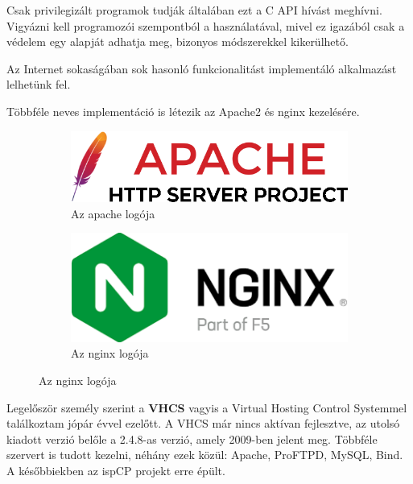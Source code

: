 Csak privilegizált programok tudják általában ezt a C API hívást meghívni. Vigyázni kell programozói szempontból a használatával, mivel ez igazából csak a védelem egy alapját adhatja meg, bizonyos módszerekkel kikerülhető.

Az Internet sokaságában sok hasonló funkcionalitást implementáló alkalmazást lelhetünk fel.

Többféle neves implementáció is létezik az Apache2 és nginx kezelésére. 

\begin{figure}[h]
	\caption{A webszerverek logói}
	\centering
	\begin{subfigure}{.5\textwidth}
		\centering
		\includegraphics[scale=0.35]{images/apache_httpd_logo.png}
		\caption{Az apache logója}
	\end{subfigure}%
	\begin{subfigure}{.5\textwidth}
		\centering
		\includegraphics[scale=0.35]{images/nginx_logo.png}
		\caption{Az nginx logója}
	\end{subfigure}%
\end{figure}

Legelőször személy szerint a \textbf{VHCS} vagyis a Virtual Hosting Control Systemmel találkoztam jópár évvel ezelőtt. A VHCS már nincs aktívan fejlesztve, az utolsó kiadott verzió belőle a 2.4.8-as verzió, amely 2009-ben jelent meg. \cite{vhcs} Többféle szervert is tudott kezelni, néhány ezek közül: Apache, ProFTPD, MySQL, Bind. A későbbiekben az ispCP projekt erre épült. \cite{ispcp} 

